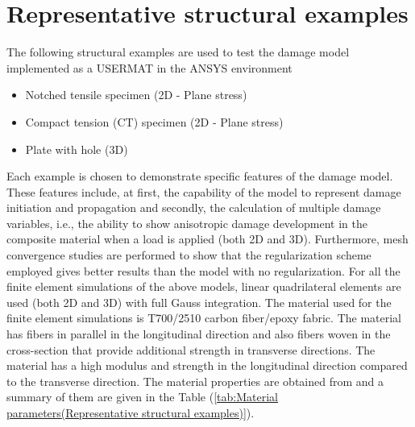 \documentclass[12pt,a4paper,twoside,openright]{report}
\begin{document}
\section{Representative structural examples}
\indent\indent\indent The following structural examples are used to test the damage model implemented as a USERMAT in the ANSYS environment
\begin{itemize}
\item Notched tensile specimen (2D - Plane stress)
\item Compact tension (CT) specimen (2D - Plane stress)
\item Plate with hole (3D)
\end{itemize}
Each example is chosen to demonstrate specific features of the damage model. These features include, at first, the capability of the model to represent damage initiation and propagation and secondly, the calculation of multiple damage variables, i.e., the ability to show anisotropic damage development in the composite material when a load is applied (both 2D and 3D). Furthermore, mesh convergence studies are performed to show that the regularization scheme employed gives better results than the model with no regularization. For all the finite element simulations of the above models, linear quadrilateral elements are used (both 2D and 3D) with full Gauss integration. The material used for the finite element simulations is T700/2510 carbon fiber/epoxy fabric. The material has fibers in parallel in the longitudinal direction and also fibers woven in the cross-section that provide additional strength in transverse directions. The material has a high modulus and strength in the longitudinal direction compared to the transverse direction. The material properties are obtained from \citep{jiang2018evaluations} and a summary of them are given in the Table (\ref{tab:Material parameters(Representative structural examples)}). \\
\end{document}
